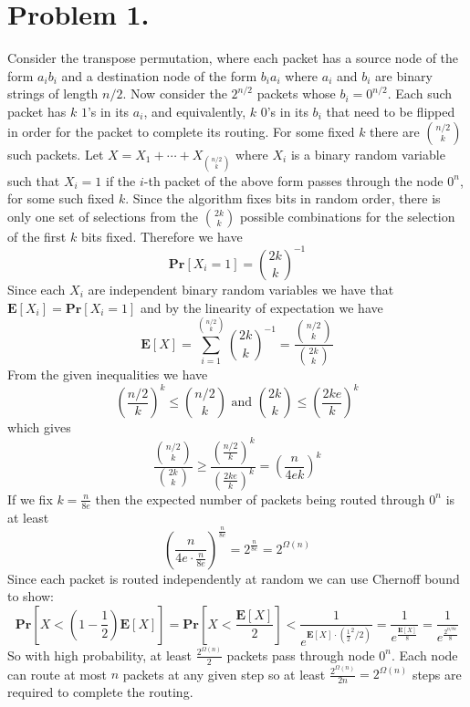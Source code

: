 \documentclass[12pt]{article}
\begin{document}
\pagestyle{plain}
\titleformat{\subsection}[runin]
  {\normalfont\large\bfseries}{\thesubsection}{1em}{}
\titleformat{\subsubsection}[runin]
  {\normalfont\large\bfseries}{\thesubsubsection}{1em}{}

\section*{Problem 1.}
Consider the transpose permutation, where each packet has a source node of
the form $a_ib_i$ and a destination node of the form $b_ia_i$ where $a_i$
and $b_i$ are binary strings of length $n/2$. Now consider the
$2^{n/2}$ packets whose $b_i = 0^{n/2}$. Each such packet has $k$ $1$'s in its
$a_i$, and equivalently, $k$ $0$'s in its $b_i$ that need to be flipped in order
for the packet to complete its routing. For some fixed $k$ there are
${n/2 \choose k}$ such packets. Let $X = X_1 + \cdots + X_{{n/2 \choose k}}$
where $X_i$ is a binary random variable such that $X_i = 1$ if the $i$-th
packet of the above form passes through the node $0^n$, for some such fixed $k$.
Since the algorithm fixes bits in random order, there is only one set of
selections from the ${2k \choose k}$ possible combinations for the selection of the first $k$ bits
fixed. Therefore we have
$$\textbf{Pr}[X_i = 1] = {2k \choose k}^{-1}$$
Since each $X_i$ are independent binary random variables we have that
$\textbf{E}[X_i] = \textbf{Pr}[X_i = 1]$ and by the linearity of expectation
we have
$$\textbf{E}[X] = \sum_{i=1}^{{n/2 \choose k}} {2k \choose k}^{-1} =
\frac{{n/2 \choose k}}{{2k \choose k}}$$
From the given inequalities we have
$$\left(\frac{n/2}{k}\right)^k \le {n/2 \choose k} \text{ and }
{2k \choose k} \le \left(\frac{2ke}{k}\right)^k$$
which gives
$$\frac{{n/2 \choose k}}{{2k \choose k}} \ge
\frac{\left(\frac{n/2}{k}\right)^k}{\left(\frac{2ke}{k}\right)^k} =
\left(\frac{n}{4ek}\right)^k$$
If we fix $k = \frac{n}{8e}$ then the expected number of packets being routed
through $0^n$ is at least
$$\left(\frac{n}{4e\cdot \frac{n}{8e}}\right)^{\frac{n}{8e}} =
2^{\frac{n}{8e}} = 2^{\Omega(n)}$$
Since each packet is routed independently at random we can use Chernoff bound to
show:
$$\textbf{Pr}[X < (1-\frac{1}{2})\textbf{E}[X]] =
\textbf{Pr}[X < \frac{\textbf{E}[X]}{2}] <
\frac{1}{e^{\textbf{E}[X]\cdot(\frac{1}{2}^2/2)}} =
\frac{1}{e^{\frac{\textbf{E}[X]}{8}}} =
\frac{1}{e^{\frac{2^{n/8e}}{8}}}
$$
So with high probability, at least $\frac{2^{\Omega(n)}}{2}$ packets pass
through node $0^n$. Each node can route at most $n$ packets at any given step so
at least $\frac{2^{\Omega(n)}}{2n} = 2^{\Omega(n)}$ steps are required to
complete the routing.
\end{document}
